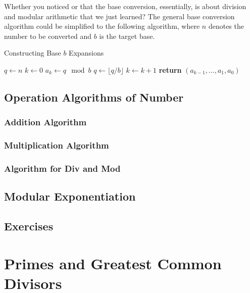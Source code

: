 Whether you noticed or that the base conversion, essentially, is about division and modular arithmetic
that we just learned? The general base conversion algorithm could be simplified to the following algorithm,
where $n$ denotes the number to be converted and $b$ is the target base.
\begin{algorithm}
    \caption{Constructing Base \( b \) Expansions}
    \begin{algorithmic}[1]
    \State $q \gets n$
    \State $k \gets 0$
    \State $a_k \gets q \mod b$
    \State $q \gets \lfloor q / b \rfloor$
    \State $k \gets k + 1$
    \EndWhile
    \State \textbf{return} $(a_{k-1}, \ldots, a_1, a_0)$ 
    \EndProcedure
    \end{algorithmic}
    \end{algorithm}
    \subsection{Operation Algorithms of Number}

    \subsubsection*{Addition Algorithm}

    \subsubsection*{Multiplication Algorithm}

    \subsubsection*{Algorithm for Div and Mod}

    \subsection{Modular Exponentiation}

    \subsection{Exercises}


    \section{Primes and Greatest Common Divisors}

